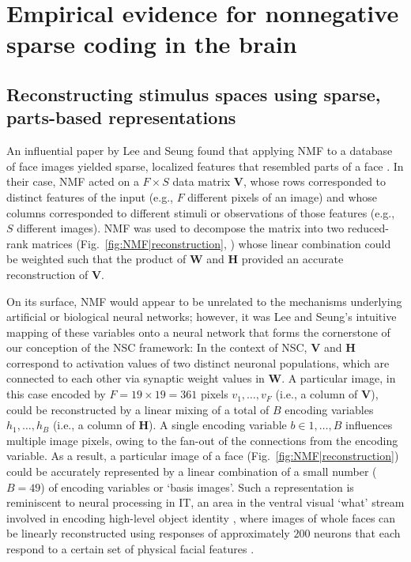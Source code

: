 \section*{Empirical evidence for nonnegative sparse coding in the brain}

\subsection*{Reconstructing stimulus spaces using sparse, parts-based representations}

An influential paper by Lee and Seung \cite{LeeSeung1999}
found that applying \ac{NMF} to a database of face images
yielded sparse, localized features that resembled parts of a face
.
In their case, \ac{NMF} acted on a
$F \times S$ data matrix \textbf{V},
whose rows corresponded to distinct features of the input 
(e.g., $F$ different pixels of an image)
and whose columns corresponded to different stimuli or 
observations of those features
(e.g., $S$ different images).
\ac{NMF} was used to decompose the matrix into two reduced-rank matrices
(Fig.~\ref{fig:NMF|reconstruction}, )
whose linear combination could be weighted such that the product of \textbf{W} and \textbf{H} provided an accurate reconstruction of \textbf{V}.

On its surface, \ac{NMF} would appear to be unrelated to 
the mechanisms underlying 
artificial or biological neural networks;
however, it was Lee and Seung's intuitive mapping of these variables onto
a neural network that forms the cornerstone 
of our conception of the \ac{NSC} framework:
In the context of \ac{NSC}, \textbf{V} and \textbf{H} correspond to activation values of two distinct neuronal populations, which are connected to each other via synaptic weight values in \textbf{W}.
A particular image, in this case encoded by $F = 19 \times 19 = 361$ 
pixels $v_1, \ldots, v_F$
(i.e., a column of \textbf{V}),
could be reconstructed by a linear mixing of a total of $B$ encoding variables
$h_1, \ldots, h_B$ (i.e., a column of \textbf{H}).
A single encoding variable $b \in 1, \ldots, B$ 
influences multiple image pixels,
owing to the fan-out of the connections from the encoding variable.
As a result, a particular image of a face 
(Fig.~\ref{fig:NMF|reconstruction})
could be accurately represented by a linear combination of 
a small number ($B = 49$) of encoding variables or `basis images'.
Such a representation is reminiscent to neural processing in \ac{IT},
an area in the ventral visual `what' stream
involved in encoding high-level object identity
\cite{BrincatConnor2004,Majaj2015},
where images of whole faces can be linearly reconstructed
using responses of approximately $200$ neurons
that each respond to a certain set of physical facial features
\cite{ChangTsao2017}.

